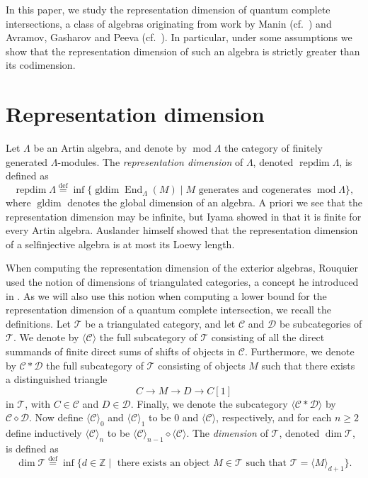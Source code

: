 \documentclass[a4paper]{amsart}
\theoremstyle{definition}
\theoremstyle{definition}
\theoremstyle{definition}
\theoremstyle{definition}
\theoremstyle{definition}
\theoremstyle{definition}
\theoremstyle{remark}
\theoremstyle{remark}
\theoremstyle{definition}
\theoremstyle{definition}
\begin{document}
In this paper, we study the representation dimension of quantum
complete intersections, a class of algebras originating from work by
Manin (cf.\ \cite{Manin}) and Avramov, Gasharov and Peeva (cf.\
\cite{Avramov}). In particular, under some assumptions we show that
the representation dimension of such an algebra is strictly greater
than its codimension.

\section{Representation dimension}\label{repdim}

Let $\Lambda$ be an Artin algebra, and denote by ${\operatorname{mod}\nolimits} \Lambda$ the
category of finitely generated $\Lambda$-modules. The
\emph{representation dimension} of $\Lambda$, denoted ${\operatorname{repdim}\nolimits}
\Lambda$, is defined as
$${\operatorname{repdim}\nolimits} \Lambda \stackrel{\text{def}}{=} \inf \{ {\operatorname{gldim}\nolimits}
{\operatorname{End}\nolimits}_{\Lambda}(M) \mid M \text{ generates and cogenerates } {\operatorname{mod}\nolimits}
\Lambda \},$$ where ${\operatorname{gldim}\nolimits}$ denotes the global dimension of an
algebra. A priori we see that the representation dimension may be
infinite, but Iyama showed in \cite{Iyama} that it is finite for
every Artin algebra. Auslander himself showed that the
representation dimension of a selfinjective algebra is at most its
Loewy length.

When computing the representation dimension of the exterior
algebras, Rouquier used the notion of dimensions of triangulated
categories, a concept he introduced in \cite{Rouquier1}. As we will
also use this notion when computing a lower bound for the
representation dimension of a quantum complete intersection, we
recall the definitions. Let $\mathcal{T}$ be a triangulated
category, and let $\mathcal{C}$ and $\mathcal{D}$ be subcategories
of $\mathcal{T}$. We denote by $\langle \mathcal{C} \rangle$ the
full subcategory of $\mathcal{T}$ consisting of all the direct
summands of finite direct sums of shifts of objects in
$\mathcal{C}$. Furthermore, we denote by $\mathcal{C} \ast
\mathcal{D}$ the full subcategory of $\mathcal{T}$ consisting of
objects $M$ such that there exists a distinguished triangle
$$C \to M \to D \to C[1]$$
in $\mathcal{T}$, with $C \in \mathcal{C}$ and $D \in \mathcal{D}$.
Finally, we denote the subcategory $\langle \mathcal{C} \ast
\mathcal{D} \rangle$ by $\mathcal{C} \diamond \mathcal{D}$. Now
define $\langle \mathcal{C} \rangle_0$ and $\langle \mathcal{C}
\rangle_1$ to be $0$ and $\langle \mathcal{C} \rangle$,
respectively, and for each $n \ge 2$ define inductively $\langle
\mathcal{C} \rangle_n$ to be $\langle \mathcal{C} \rangle_{n-1}
\diamond \langle \mathcal{C} \rangle$. The \emph{dimension} of
$\mathcal{T}$, denoted $\dim \mathcal{T}$, is defined as
$$\dim \mathcal{T} \stackrel{\text{def}}{=} \inf \{ d \in
\mathbb{Z} \mid \text{ there exists an object } M \in \mathcal{T}
\text{ such that } \mathcal{T} = \langle M \rangle_{d+1} \}.$$
\end{document}
